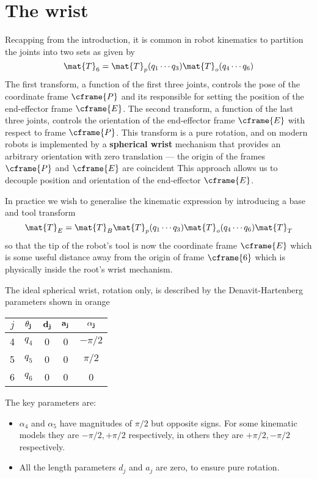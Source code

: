 \documentclass[11pt]{article}
\numberwithin{equation}{section}
\begin{document}
\section{The wrist}\label{sec:wrist}
Recapping from the introduction, it is common in robot kinematics  to partition the joints into two sets as given by 
\[
\mat{T}_6 = \mat{T}_p(q_1 \cdots q_3) \mat{T}_o(q_4 \cdots q_6) 
\]
The first transform, a function of the  first three joints, controls the pose of the coordinate frame $\cframe{P}$ and its responsible for setting the position
of the end-effector frame $\cframe{E}$.
The second transform, a function of the last three joints, controls the orientation of the end-effector frame $\cframe{E}$ with respect to frame
$\cframe{P}$.  This transform is a pure rotation, and on modern robots is implemented by  a \textbf{spherical wrist} mechanism that provides an arbitrary orientation with zero translation --- the origin of the frames
$\cframe{P}$ and $\cframe{E}$ are coincident 
This  approach allows us to decouple position and orientation of the end-effector $\cframe{E}$.

In practice we wish to generalise the kinematic expression by introducing a base and tool transform
\[
\mat{T}_E = \mat{T}_B \mat{T}_p(q_1 \cdots q_3) \mat{T}_o(q_4 \cdots q_6)  \mat{T}_T
\]
so that the tip of the robot's tool is now the coordinate frame $\cframe{E}$ which is some useful distance away from the origin of frame $\cframe{6}$ which
is physically inside the root's wrist mechanism.

The ideal spherical wrist, rotation only, is described by the Denavit-Hartenberg parameters shown in orange
\begin{center}
\begin{tabular}{|c|c|c|c|c|} \hline
$j$ & $\bf \theta_j$ & $\bf d_j$ & $\bf a_j$ & $\bf \alpha_j$ \\ \hline
\rowcolor{Peach}4 & $q_4$ & \cellcolor{white} 0 & 0 & $-\pi/2$ \\
\rowcolor{Peach}5 &  $q_5$ & 0 & 0 & $\pi/2$ \\
\cellcolor{Peach} 6 & \cellcolor{Peach} $q_6$ & 0 &0  & 0 \\ \hline
\end{tabular}
\end{center}
The key parameters are:
\begin{itemize}
\item $\alpha_4$ and $\alpha_5$ have magnitudes of $\pi/2$ but opposite signs.  For some kinematic models they are $-\pi/2, +\pi/2$ respectively, 
in others they are $+\pi/2, -\pi/2$ respectively.
\item All the length parameters $d_j$ and $a_j$ are zero, to ensure pure rotation.
\end{itemize}
\end{document}
